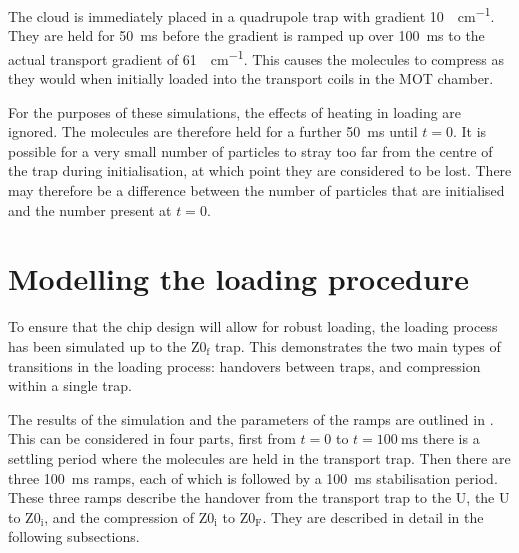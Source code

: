 The cloud is immediately placed in a quadrupole trap with gradient
\SI{10}{\gauss\per\centi\meter}. They are held for \SI{50}{\milli\second}
before the gradient is ramped up over \SI{100}{\milli\second} to the actual
transport gradient of \SI{61}{\gauss\per\centi\meter}. This causes the
molecules to compress as they would when initially loaded into the transport
coils in the MOT chamber.

For the purposes of these simulations, the effects of heating in loading are
ignored. The molecules are therefore held for a further \SI{50}{\milli\second}
until $t=0$. It is possible for a very small number of particles to stray too
far from the centre of the trap during initialisation, at which point they are
considered to be lost. There may therefore be a difference between the number
of particles that are initialised and the number present at $t=0$.

\section{Modelling the loading procedure}
\label{design:sim}

To ensure that the chip design will allow for robust loading, the loading
process has been simulated up to the $\mathrm{Z0_f}$ trap. This demonstrates
the two main types of transitions in the loading process: handovers between
traps, and compression within a single trap.

The results of the simulation and the parameters of the ramps are outlined in
. This can be considered in four parts, first
from $t = 0$ to $t=\SI{100}{\milli\second}$ there is a settling period where
the molecules are held in the transport trap. Then there are three
\SI{100}{\milli\second} ramps, each of which is followed by a
\SI{100}{\milli\second} stabilisation period. These three ramps describe the
handover from the transport trap to the U, the U to $\mathrm{Z0_i}$, and the
compression of $\mathrm{Z0_i}$ to $\mathrm{Z0_F}$. They are described in detail
in the following subsections.

